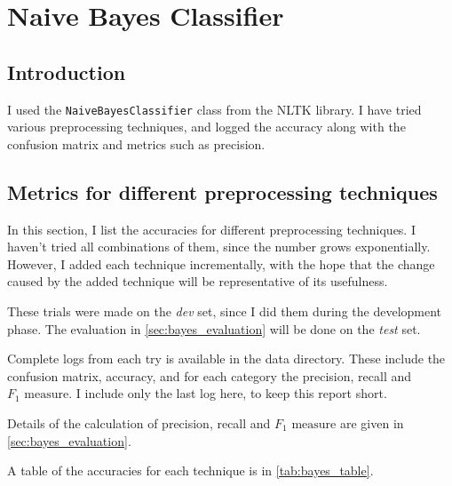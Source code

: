 \section{Naive Bayes Classifier}
\label{sec:bayes}

\subsection{Introduction}

I used the \texttt{NaiveBayesClassifier} class from the NLTK library. I have tried various preprocessing techniques, and logged the accuracy along with the confusion matrix and metrics such as precision.

\subsection{Metrics for different preprocessing techniques}

In this section, I list the accuracies for different preprocessing techniques. I haven't tried all combinations of them, since the number grows exponentially. However, I added each technique incrementally, with the hope that the change caused by the added technique will be representative of its usefulness.

These trials were made on the \emph{dev} set, since I did them during the development phase. The evaluation in \autoref{sec:bayes_evaluation} will be done on the \emph{test} set.

Complete logs from each try is available in the data directory. These include the confusion matrix, accuracy, and for each category the precision, recall and $F_1\text{ measure}$. I include only the last log here, to keep this report short.

Details of the calculation of precision, recall and $F_1\text{ measure}$ are given in \autoref{sec:bayes_evaluation}.

A table of the accuracies for each technique is in \autoref{tab:bayes_table}.

